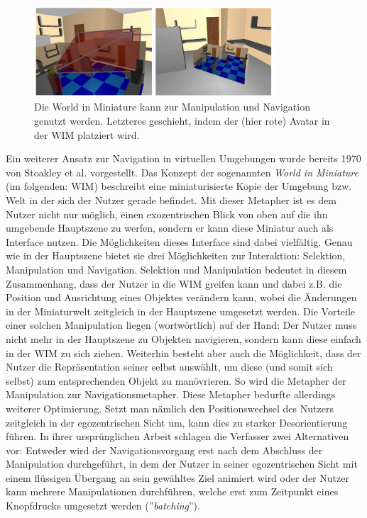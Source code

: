 \begin{figure}[h]
  \centering
  \includegraphics[width=0.8\textwidth]{images/wim1.png}
  \caption{Die World in Miniature  kann zur Manipulation und Navigation genutzt werden. Letzteres geschieht, indem der (hier rote) Avatar in der WIM platziert wird. \cite{Stoakley2010VirtualWIM}}
  \label{fig:todo}
\end{figure}

Ein weiterer Ansatz zur Navigation in virtuellen Umgebungen wurde bereits 1970 von Stoakley et al. \cite{Stoakley2010VirtualWIM} vorgestellt. Das Konzept der sogenannten \textit{World in Miniature} (im folgenden: WIM) beschreibt eine miniaturisierte Kopie der Umgebung bzw. Welt in der sich der Nutzer gerade befindet. Mit dieser Metapher ist es dem Nutzer nicht nur möglich, einen exozentrischen Blick von oben auf die ihn umgebende Hauptszene zu werfen, sondern er kann diese Miniatur auch als Interface nutzen. Die Möglichkeiten dieses Interface sind dabei vielfältig. Genau wie in der Hauptszene bietet sie drei Möglichkeiten zur Interaktion: Selektion, Manipulation und Navigation.
Selektion und Manipulation bedeutet in diesem Zusammenhang, dass der Nutzer in die WIM \glqq greifen \grqq{} kann und dabei z.B. die Position und Ausrichtung eines Objektes verändern kann, wobei die Änderungen in der Miniaturwelt zeitgleich in der Hauptszene umgesetzt werden. Die Vorteile einer solchen Manipulation liegen (wortwörtlich) auf der Hand: Der Nutzer muss nicht mehr in der Hauptszene zu Objekten navigieren, sondern kann diese einfach in der WIM zu sich ziehen. 
Weiterhin besteht aber auch die Möglichkeit, dass der Nutzer die Repräsentation seiner selbst auswählt, um diese (und somit sich selbst) zum entsprechenden Objekt zu manövrieren. So wird die Metapher der Manipulation zur Navigationsmetapher.
Diese Metapher bedurfte allerdings weiterer Optimierung. Setzt man nämlich den Positionswechsel des Nutzers zeitgleich in der egozentrischen Sicht um, kann dies zu starker Desorientierung führen. In ihrer ursprünglichen Arbeit schlagen die Verfasser zwei Alternativen vor: Entweder wird der Navigationsvorgang erst nach dem Abschluss der Manipulation durchgeführt, in dem der Nutzer in seiner egozentrischen Sicht mit einem flüssigen Übergang an sein gewähltes Ziel animiert wird oder der Nutzer kann mehrere Manipulationen durchführen, welche erst zum Zeitpunkt eines Knopfdrucks umgesetzt werden (”\textit{batching}”). 

